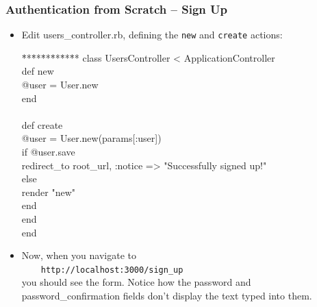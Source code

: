\documentclass[t,handout]{beamer}
\begin{document}
\begin{frame}\frametitle{Authentication from Scratch -- Sign Up}
{\small
\begin{itemize}
 \item Edit users\_controller.rb, defining the {\tt new} and {\tt create} actions:
{\tt\scriptsize \begin{tabbing} \=**\=**\=**\=**\=**\=** \kill
 class UsersController < ApplicationController \\ 
\>  def new \\
\>\>   @user = User.new \\
\>  end \\ \\
\>  def create \\
\>\>    @user = User.new(params[:user]) \\
\>\>    if @user.save \\
\>\>\>      redirect\_to root\_url, :notice => "Successfully signed up!" \\
\>\>   else \\
\>\>\>      render "new" \\
\>\>    end \\
\>  end \\
 end
\end{tabbing}}   
\pause
 \item Now, when you navigate to ~\\
  \ \ \ \ {\tt http://localhost:3000/sign\_up}~\\
  you should see the form.  
  \pause
  Notice how the password and password\_confirmation fields don't display the text typed into them.
 \end{itemize}}
\end{frame}   
\end{document}
